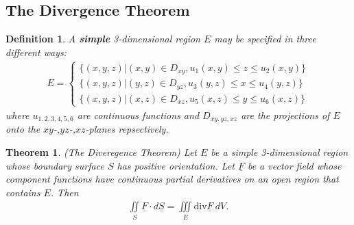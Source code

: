 \documentclass{article}
\theoremstyle{sltheorem}
\newtheorem{definition}{Definition}[section]
\newtheorem{theorem}{Theorem}[section]
\newcommand{\di}{\iint\limits}
\newcommand{\ti}{\iiint\limits}
\renewcommand{\div}{\text{div}}
\renewcommand{\vec}{\underline}
\newcommand*\B[1]{\textbf{#1}}
\begin{document}
\subsection{The Divergence Theorem}
\begin{definition}
    A \B{simple} 3-dimensional region $E$ may be specified in three different ways:
    \begin{align*}
        E=\begin{cases}
            \{(x,y,z)|(x,y)\in D_{xy}, u_1(x,y)\leq z \leq u_2(x,y)\}\\
            \{(x,y,z)|(y,z)\in D_{yz}, u_3(y,z)\leq x \leq u_4(y,z)\}\\
            \{(x,y,z)|(x,z)\in D_{xz}, u_5(x,z)\leq y \leq u_6(x,z)\}
        \end{cases}
    \end{align*}
    where $u_{1,2,3,4,5,6}$ are continuous functions and $D_{xy,yz,xz}$ are the projections
    of $E$ onto the $xy$-,$yz$-,$xz$-planes repsectively.
\end{definition}
\begin{theorem}(The Diveregence Theorem)
    Let $E$ be a simple 3-dimensional region whose boundary surface $S$ has positive
    orientation. Let $\vec F$ be a vector field whose component functions have continuous
    partial derivatives on an open region that contains $E$. Then
    \begin{align*}
        \di_S \vec F\cdot d\vec S = \ti_E \div\vec F\:dV.
    \end{align*}
\end{theorem}
\end{document}
